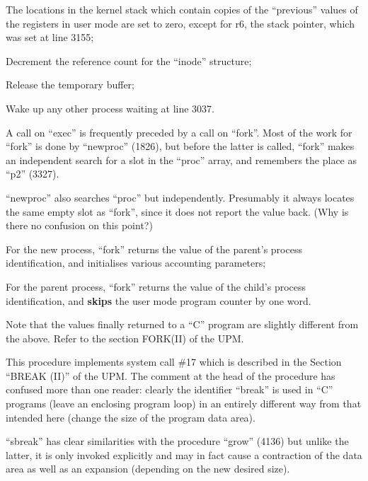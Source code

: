 \item[3186:] The locations in the kernel stack
which contain copies of the ``previous'' values of the registers in
user mode are set to zero, except
for r6, the stack pointer, which
was set at line 3155;

\item[3194:] Decrement the reference count for
 the ``inode'' structure;

\item[3195:] Release the temporary buffer;

\item[3196:] Wake up any other process waiting
 at line 3037.
\ed



A call on ``exec'' is frequently preceded
by a call on ``fork''. Most of the work
for ``fork'' is done by ``newproc'' (1826),
but before the latter is called, ``fork''
makes an independent search for a slot
in the ``proc'' array, and remembers the
place as ``p2'' (3327).

``newproc'' also searches ``proc'' but
independently. Presumably it always
locates the same empty slot as ``fork'',
since it does not report the value
back. (Why is there no confusion on
this point?)

\bd
\item[3335:] For the new process, ``fork''
returns the value of the parent's
process identification, and initialises various accounting
parameters;

\item[3344:] For the parent process, ``fork''
returns the value of the child's
process identification, and {\bf skips}
the user mode program counter by
one word.
\ed

\noindent Note that the values finally returned
to a ``C'' program are slightly different
from the above. Refer to the section
FORK(II) of the UPM.


This procedure implements system call
\#17 which is described in the Section
``BREAK (II)'' of the UPM. The comment at
the head of the procedure has confused
more than one reader: clearly the identifier
``break'' is used in ``C'' programs
(leave an enclosing program loop) in an
entirely different way from that
intended here (change the size of the
program data area).

``sbreak'' has clear similarities with
the procedure ``grow'' (4136) but unlike
the latter, it is only invoked explicitly and
may in fact cause a contraction of the data area as well as an
expansion (depending on the new desired
size).

